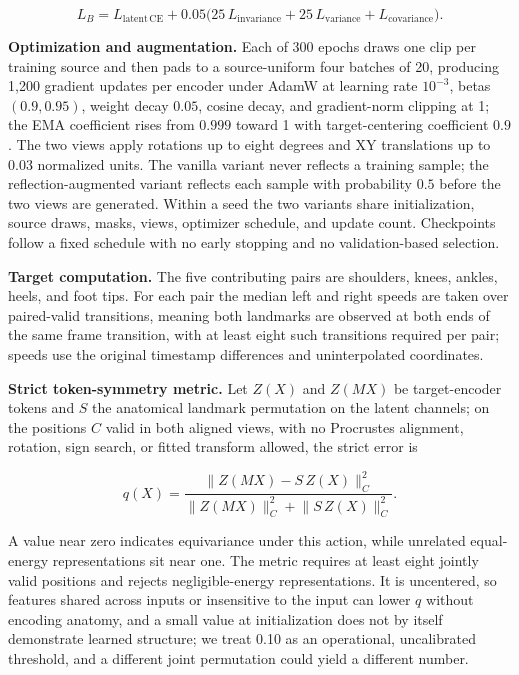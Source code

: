 \documentclass{article}
\begin{document}
\[
L_B = L_{\mathrm{latent\,CE}} + 0.05\bigl(25\,L_{\mathrm{invariance}} + 25\,L_{\mathrm{variance}} + L_{\mathrm{covariance}}\bigr).
\]

\textbf{Optimization and augmentation.} Each of 300 epochs draws one
clip per training source and then pads to a source-uniform four batches
of 20, producing 1,200 gradient updates per encoder under AdamW at
learning rate \(10^{-3}\), betas \((0.9, 0.95)\), weight decay \(0.05\),
cosine decay, and gradient-norm clipping at 1; the EMA coefficient rises
from \(0.999\) toward 1 with target-centering coefficient \(0.9\). The
two views apply rotations up to eight degrees and XY translations up to
\(0.03\) normalized units. The vanilla variant never reflects a training
sample; the reflection-augmented variant reflects each sample with
probability \(0.5\) before the two views are generated. Within a seed
the two variants share initialization, source draws, masks, views,
optimizer schedule, and update count. Checkpoints follow a fixed
schedule with no early stopping and no validation-based selection.

\textbf{Target computation.} The five contributing pairs are shoulders,
knees, ankles, heels, and foot tips. For each pair the median left and
right speeds are taken over paired-valid transitions, meaning both
landmarks are observed at both ends of the same frame transition, with
at least eight such transitions required per pair; speeds use the
original timestamp differences and uninterpolated coordinates.

\textbf{Strict token-symmetry metric.} Let \(Z(X)\) and \(Z(MX)\) be
target-encoder tokens and \(S\) the anatomical landmark permutation on
the latent channels; on the positions \(C\) valid in both aligned views,
with no Procrustes alignment, rotation, sign search, or fitted transform
allowed, the strict error is

\[
q(X) = \frac{\lVert Z(MX) - S\,Z(X)\rVert_C^2}{\lVert Z(MX)\rVert_C^2 + \lVert S\,Z(X)\rVert_C^2}.
\]

A value near zero indicates equivariance under this action, while
unrelated equal-energy representations sit near one. The metric requires
at least eight jointly valid positions and rejects negligible-energy
representations. It is uncentered, so features shared across inputs or
insensitive to the input can lower \(q\) without encoding anatomy, and a
small value at initialization does not by itself demonstrate learned
structure; we treat 0.10 as an operational, uncalibrated threshold, and
a different joint permutation could yield a different number.
\end{document}
